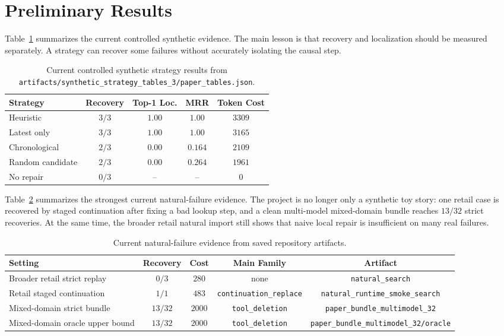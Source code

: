 \documentclass[11pt]{article}
\begin{document}
\section{Preliminary Results}

Table~\ref{tab:synthetic} summarizes the current controlled synthetic evidence.
The main lesson is that recovery and localization should be measured
separately. A strategy can recover some failures without accurately isolating
the causal step.

\begin{table}[t]
  \centering
  \caption{Current controlled synthetic strategy results from
  \texttt{artifacts/synthetic\_strategy\_tables\_3/paper\_tables.json}.}
  \label{tab:synthetic}
  \begin{tabular}{lcccc}
    \toprule
    Strategy & Recovery & Top-1 Loc. & MRR & Token Cost \\
    \midrule
    Heuristic & $3/3$ & $1.00$ & $1.00$ & $3309$ \\
    Latest only & $3/3$ & $1.00$ & $1.00$ & $3165$ \\
    Chronological & $2/3$ & $0.00$ & $0.164$ & $2109$ \\
    Random candidate & $2/3$ & $0.00$ & $0.264$ & $1961$ \\
    No repair & $0/3$ & -- & -- & $0$ \\
    \bottomrule
  \end{tabular}
\end{table}

Table~\ref{tab:natural} summarizes the strongest current natural-failure
evidence. The project is no longer only a synthetic toy story: one retail case
is recovered by staged continuation after fixing a bad lookup step, and a clean
multi-model mixed-domain bundle reaches $13/32$ strict recoveries. At the same
time, the broader retail natural import still shows that naive local repair is
insufficient on many real failures.

\begin{table}[t]
  \centering
  \caption{Current natural-failure evidence from saved repository artifacts.}
  \label{tab:natural}
  \begin{tabular}{p{4.2cm}cccc}
    \toprule
    Setting & Recovery & Cost & Main Family & Artifact \\
    \midrule
    Broader retail strict replay & $0/3$ & $280$ & none &
    \texttt{natural\_search} \\
    Retail staged continuation & $1/1$ & $483$ &
    \texttt{continuation\_replace} &
    \texttt{natural\_runtime\_smoke\_search} \\
    Mixed-domain strict bundle & $13/32$ & $2000$ &
    \texttt{tool\_deletion} &
    \texttt{paper\_bundle\_multimodel\_32} \\
    Mixed-domain oracle upper bound & $13/32$ & $2000$ &
    \texttt{tool\_deletion} &
    \texttt{paper\_bundle\_multimodel\_32/oracle} \\
    \bottomrule
  \end{tabular}
\end{table}
\end{document}
